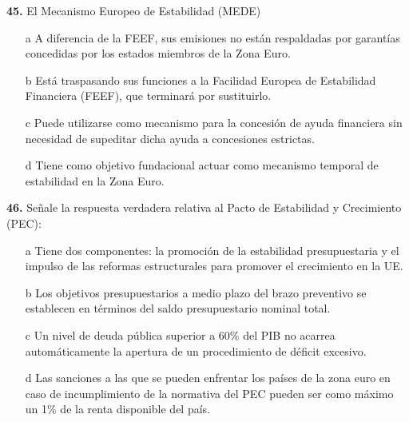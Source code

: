 \documentclass{nuevotema}
\begin{document}

\textbf{45.} El Mecanismo Europeo de Estabilidad (MEDE)
\begin{enumerate}
	\item[a] A diferencia de la FEEF, sus emisiones no están respaldadas por garantías concedidas por los estados miembros de la Zona Euro.
	\item[b] Está traspasando sus funciones a la Facilidad Europea de Estabilidad Financiera (FEEF), que terminará por sustituirlo.
	\item[c] Puede utilizarse como mecanismo para la concesión de ayuda financiera sin necesidad de supeditar dicha ayuda a concesiones estrictas.
	\item[d] Tiene como objetivo fundacional actuar como mecanismo temporal de estabilidad en la Zona Euro.
\end{enumerate}


\textbf{46.} Señale la respuesta verdadera relativa al Pacto de Estabilidad y Crecimiento (PEC):
\begin{enumerate}
	\item[a] Tiene dos componentes: la promoción de la estabilidad presupuestaria y el impulso de las reformas estructurales para promover el crecimiento en la UE.
	\item[b] Los objetivos presupuestarios a medio plazo del brazo preventivo se establecen en términos del saldo presupuestario nominal total.
	\item[c] Un nivel de deuda pública superior a 60\% del PIB no acarrea automáticamente la apertura de un procedimiento de déficit excesivo.
	\item[d] Las sanciones a las que se pueden enfrentar los países de la zona euro en caso de incumplimiento de la normativa del PEC pueden ser como máximo un 1\% de la renta disponible del país.
\end{enumerate}
\end{document}

